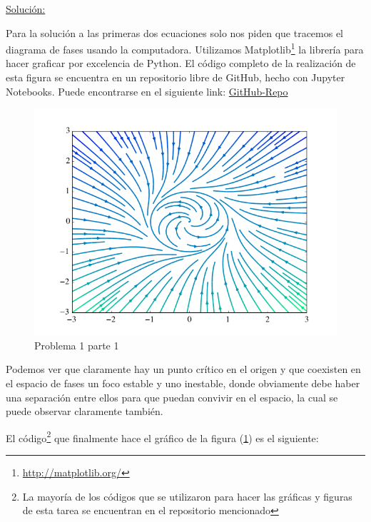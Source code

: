 \documentclass[a4paper,10pt]{article}
\numberwithin{equation}{section}
\begin{document}
\vspace{.3cm}

\underline{Solución:}

Para la solución a las primeras dos ecuaciones solo nos piden que tracemos el diagrama
de fases usando la computadora. Utilizamos Matplotlib\footnote{\href{http://matplotlib.org/}{http://matplotlib.org/}} la librería para hacer graficar 
por excelencia de Python. El código completo de la realización de esta figura se encuentra
en un repositorio libre de GitHub, hecho con Jupyter Notebooks. Puede encontrarse en el
siguiente link: \href{https://github.com/FavioVazquez/MecanicaClasica-PCF/blob/master/Tarea2/Tarea2\%20-\%20Problema1.ipynb}{GitHub-Repo}

\begin{figure}[ht]
 \centering
\includegraphics[scale=0.5]{problema1fig1}
\caption{Problema 1 parte 1}
\label{fig:problema1fig1}
\end{figure}


\vspace{.3cm}

Podemos ver que claramente hay un punto crítico en el origen y que coexisten 
en el espacio de fases un foco estable y uno inestable, donde obviamente debe haber
una separación entre ellos para que puedan convivir en el espacio, la cual se puede
observar claramente también.

\vspace{.3cm}

El código\footnote{La mayoría de los códigos que se utilizaron para hacer
las gráficas y figuras de esta tarea se encuentran en el repositorio 
mencionado} que finalmente hace el gráfico de la figura (\ref{fig:problema1fig1}) es el siguiente:
\end{document}
